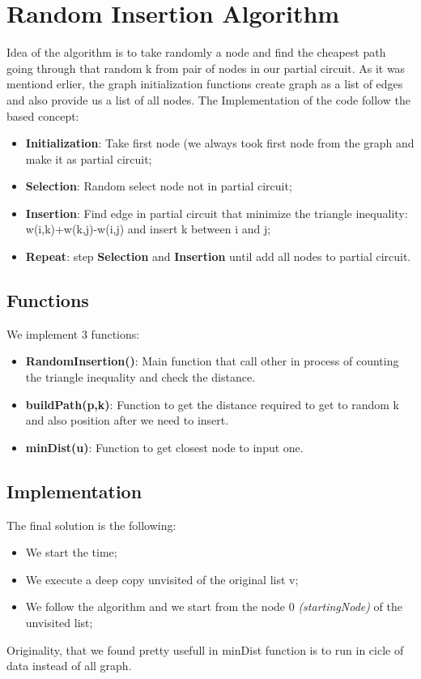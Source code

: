 \section{Random Insertion Algorithm}\label{randominsertion}
Idea of the algorithm is to take randomly a node and find the cheapest path going through that random k from pair of nodes in our partial circuit. 
As it was mentiond erlier, the graph initialization functions create graph as a list of edges and also provide us a list of all nodes.
The Implementation of the code follow the based concept:

\begin{itemize}
    \item \textbf{Initialization}: Take first node (we always took first node from the graph and make it as partial circuit;
    \item \textbf{Selection}: Random select node not in partial circuit;
    \item \textbf{Insertion}: Find edge in partial circuit that minimize the triangle inequality: w(i,k)+w(k,j)-w(i,j) and insert k between i and j;
    \item \textbf{Repeat}: step \textbf{Selection} and \textbf{Insertion} until add all nodes to partial circuit.
\end{itemize}


\subsection{Functions}
We implement 3 functions: 

\begin{itemize}
	\item \textbf{RandomInsertion()}: Main function that call other in process of counting the triangle inequality and check the distance.
	\item \textbf{buildPath(p,k)}: Function to get the distance required to get to random k and also position after we need to insert. 
	\item \textbf{minDist(u)}: Function to get closest node to input one.
\end{itemize}

\subsection{Implementation}
The final solution is the following:
\begin{itemize}
	\item We start the time;
	\item We execute a deep copy unvisited of the original list v;
	\item We follow the algorithm and we start from the node 0 \textit{(startingNode)} of the unvisited list;
\end{itemize}

Originality, that we found pretty usefull in minDist function is to run in cicle of data instead of all graph.




\pagebreak